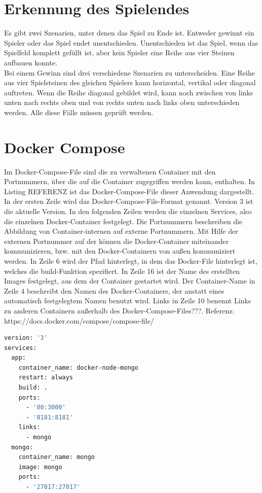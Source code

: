\section{Erkennung des Spielendes}\label{sec:GameOver}
Es gibt zwei Szenarien, unter denen das Spiel zu Ende ist. Entweder gewinnt ein Spieler oder das Spiel endet unentschieden. Unentschieden ist das Spiel, wenn das Spielfeld komplett gefüllt ist, aber kein Spieler eine Reihe aus vier Steinen aufbauen konnte.\\
Bei einem Gewinn sind drei verschiedene Szenarien zu unterscheiden. Eine Reihe aus vier Spielsteinen des gleichen Spielers kann horizontal, vertikal oder diagonal auftreten. Wenn die Reihe diagonal gebildet wird, kann noch zwischen von links unten nach rechts oben und von rechts unten nach links oben unterschieden werden. Alle diese Fälle müssen geprüft werden.

\section{Docker Compose}\label{sec:Docker-Compose}
Im Docker-Compose-File sind die zu verwaltenen Container mit den Portnummern, über die auf die Container zugegriffen werden kann, enthalten.
In Listing REFERENZ ist das Docker-Compose-File dieser Anwendung dargestellt.
In der ersten Zeile wird das Docker-Compose-File-Format genannt. Version 3 ist die aktuelle Version. In den folgenden Zeilen werden die einzelnen Services, also die einzelnen Docker-Container festgelegt.
Die Portnummern beschreiben die Abbildung von Container-internen auf externe Portnummern. Mit Hilfe der externen Portnummer auf der können die Docker-Container miteinander kommunizieren, bzw. mit den Docker-Containern von außen kommuniziert werden.
In Zeile 6 wird der Pfad hinterlegt, in dem das Docker-File hinterlegt ist, welches die build-Funktion spezifiert. 
In Zeile 16 ist der Name des erstellten Images festgelegt, aus dem der Container gestartet wird. Der Container-Name in Zeile 4 beschreibt den Namen des Docker-Containers, der anstatt eines automatisch festgelegtem Namen benutzt wird. Links in Zeile 10 benennt Links zu anderen Containern außerhalb des Docker-Compose-Files???. Referenz: https://docs.docker.com/compose/compose-file/
\begin{lstlisting}[language=bash, caption={docker-compose.yml-File}, label=lis:POST]
version: '3'
services:
  app:
    container_name: docker-node-mongo
    restart: always
    build: .
    ports:
      - '80:3000'
      - '8181:8181'
    links:
      - mongo
  mongo:
    container_name: mongo
    image: mongo
    ports:
      - '27017:27017'


\end{lstlisting}


